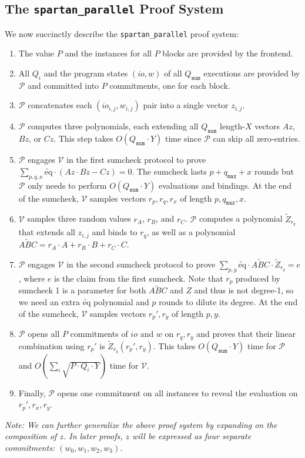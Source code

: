 \documentclass{article}
\newcommand{\code}{\texttt}
\newcommand{\Qsum}{Q_{\mathtt{sum}}}
\newcommand{\qmax}{q_{\mathtt{max}}}
\renewcommand{\P}{\mathcal{P}}
\newcommand{\V}{\mathcal{V}}
\newcommand{\Z}{\widetilde{Z}}
\newcommand{\ABC}{\widetilde{ABC}}
\newcommand{\eq}{\widetilde{\mbox{eq}}}
\begin{document}
\subsection{The \code{spartan\_parallel} Proof System}
We now succinctly describe the \code{spartan\_parallel} proof system:
\begin{enumerate}
    \item The value $P$ and the instances for all $P$ blocks are provided by the frontend.
    \item All $Q_i$ and the program states $(io, w)$ of all $\Qsum$ executions are provided by $\P$ and committed into $P$ commitments, one for each block.
    \item $\P$ concatenates each $(io_{i, j}, w_{i, j})$ pair into a single vector $z_{i, j}$.
    \item $\P$ computes three polynomials, each extending all $\Qsum$ length-$X$ vectors $Az$, $Bz$, or $Cz$. This step takes $O(\Qsum\cdot Y)$ time since $\P$ can skip all zero-entries.
    \item $\P$ engages $\V$ in the first sumcheck protocol to prove $\sum_{p, q, x} \eq\cdot (Az \cdot Bz - Cz) = 0$. The sumcheck lasts $p + \qmax + x$ rounds but $\P$ only needs to perform $O(\Qsum\cdot Y)$ evaluations and bindings. At the end of the sumcheck, $\V$ samples vectors $r_p, r_q, r_x$ of length $p, \qmax, x$.
    \item $\V$ samples three random values $r_A$, $r_B$, and $r_C$. $\P$ computes a polynomial $\Z_{r_q}$ that extends all $z_{i, j}$ and binds to $r_q$, as well as a polynomial $\ABC = r_A\cdot A + r_B\cdot B + r_C\cdot C$.
    \item $\P$ engages $\V$ in the second sumcheck protocol to prove $\sum_{p, y} \eq\cdot \ABC \cdot \Z_{r_q} = e$, where $e$ is the claim from the first sumcheck. Note that
    $r_p$ produced by sumcheck 1 is a parameter for both $\ABC$ and $Z$ and thus is not degree-1, so we need an extra $\eq$ polynomial and $p$ rounds to dilute its degree. At the end of the sumcheck, $\V$ samples vectors $r_p', r_y$ of length $p, y$.
    \item $\P$ opens all $P$ commitments of $io$ and $w$ on $r_q, r_y$ and proves that their linear combination using $r_p'$ is $\Z_{r_q}(r_p', r_y)$. This takes $O(\Qsum\cdot Y)$ time for $\P$ and $O(\sum_i\sqrt{P\cdot Q_i\cdot Y})$ time for $\V$.
    \item Finally, $\P$ opens one commitment on all instances to reveal the evaluation on $r_p', r_x, r_y$.
\end{enumerate}
\emph{Note: We can further generalize the above proof system by expanding on the composition of $z$. In later proofs, $z$ will be expressed as four separate commitments: $(w_0, w_1, w_2, w_3)$.}
\end{document}
